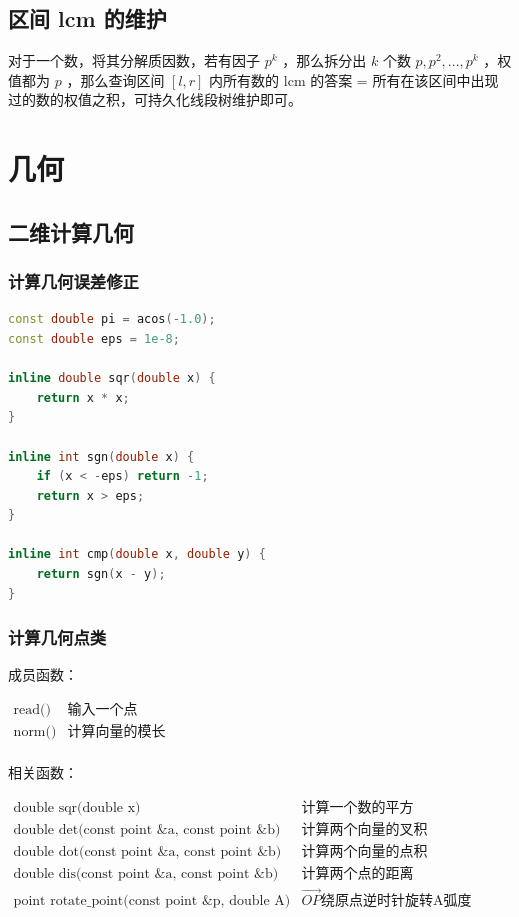 \documentclass{article}
\begin{document}
\subsection{区间 lcm 的维护}
对于一个数，将其分解质因数，若有因子 $p^k$ ，那么拆分出 $k$ 个数 $p, p^2, ..., p^k$ ，权值都为 $p$ ，那么查询区间 $[l, r]$ 内所有数的 lcm 的答案 = 所有在该区间中出现过的数的权值之积，可持久化线段树维护即可。

\section{几何}

\subsection{二维计算几何}

\subsubsection{计算几何误差修正}

\begin{lstlisting}[language=C++]
const double pi = acos(-1.0);
const double eps = 1e-8;

inline double sqr(double x) {
	return x * x;
}

inline int sgn(double x) {
	if (x < -eps) return -1;
	return x > eps;
}

inline int cmp(double x, double y) {
	return sgn(x - y);
}
\end{lstlisting}

\subsubsection{计算几何点类}

成员函数：


$
\begin{array}{lr}
	\text{read()} & \text{输入一个点} \\
	\text{norm()} & \text{计算向量的模长} \\
\end{array}
$

相关函数：

$
\begin{array}{lr}
	\text{double sqr(double x)} & \text{计算一个数的平方} \\
	\text{double det(const point \&a, const point \&b)} & \text{计算两个向量的叉积} \\
	\text{double dot(const point \&a, const point \&b)} & \text{计算两个向量的点积} \\
	\text{double dis(const point \&a, const point \&b)} & \text{计算两个点的距离} \\
	\text{point rotate\_point(const point \&p, double A)} &\overrightarrow{OP}  \text{绕原点逆时针旋转A弧度} \\
	
\end{array}
$
\end{document}
